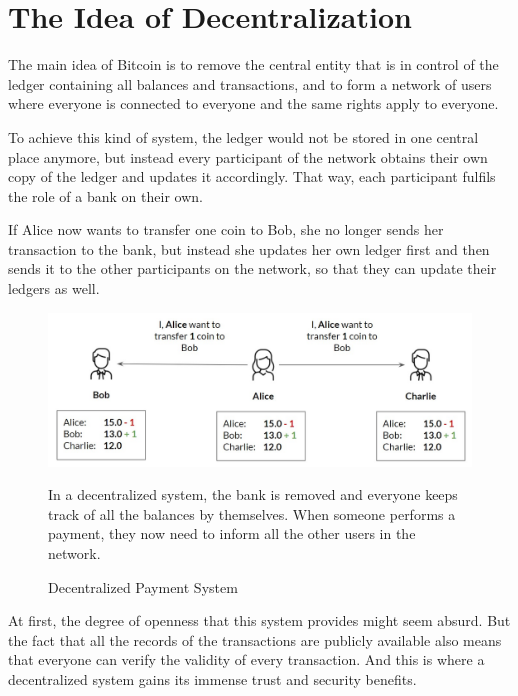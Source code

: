 \documentclass[a4paper, 12pt]{report}
\begin{document}
\section{The Idea of Decentralization}

\par The main idea of Bitcoin is to remove the central entity that is in control of the ledger containing all balances and transactions, and to form a network of users where everyone is connected to everyone and the same rights apply to everyone.

\par To achieve this kind of system, the ledger would not be stored in one central place anymore, but instead every participant of the network obtains their own copy of the ledger and updates it accordingly. That way, each participant fulfils the role of a bank on their own.

\par If Alice now wants to transfer one coin to Bob, she no longer sends her transaction to the bank, but instead she updates her own ledger first and then sends it to the other participants on the network, so that they can update their ledgers as well.

\begin{figure}[h]
	\includegraphics[width=\textwidth]{02_Naive_System}
	\caption{Decentralized Payment System}
	\medskip
	\small In a decentralized system, the bank is removed and everyone keeps track of all the balances by themselves. When someone performs a payment, they now need to inform all the other users in the network.
	\label{fig:02_Naive_System}
\end{figure}

\par At first, the degree of openness that this system provides might seem absurd. But the fact that all the records of the transactions are publicly available also means that everyone can verify the validity of every transaction. And this is where a decentralized system gains its immense trust and security benefits.
\end{document}
